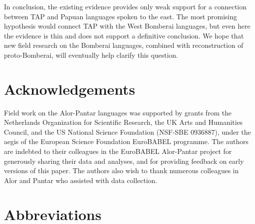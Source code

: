 In conclusion, the existing evidence provides only weak support for a connection between TAP and Papuan languages spoken to the east. The most promising hypothesis would connect TAP with the West Bomberai languages, but even here the evidence is thin and does not support a definitive conclusion. We hope that new field research on the Bomberai languages, combined with reconstruction of proto-Bomberai, will eventually help clarify this question.

\section*{Acknowledgements}

Field work on the Alor-Pantar languages was supported by grants from the Netherlands Organization for Scientific Research, the UK Arts and Humanities Council, and the US National Science Foundation (NSF-SBE 0936887), under the aegis of the European Science Foundation EuroBABEL programme. The authors are indebted to their colleagues in the \mbox{EuroBABEL} Alor-Pantar project for generously sharing their data and analyses, and for providing feedback on early versions of this paper. The authors also wish to thank numerous colleagues in Alor and Pantar who assisted with data collection.


\section*{Abbreviations}


